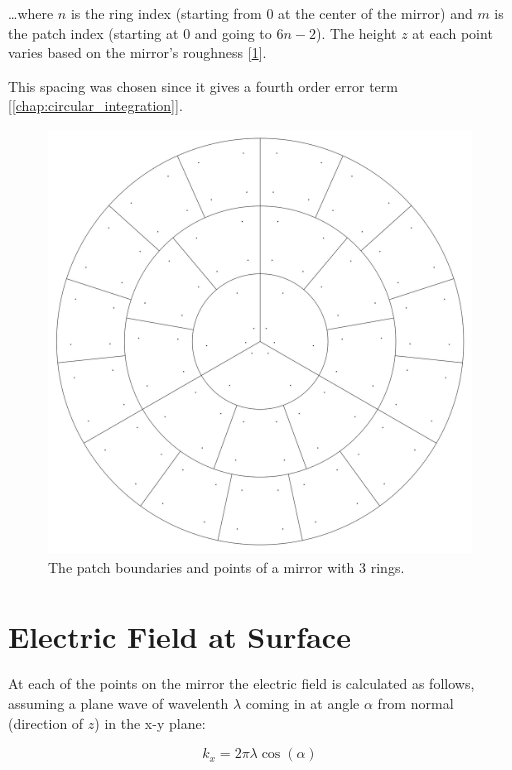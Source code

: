 \documentclass[etd,twoside,senior]{BYUPhys}
\begin{document}
\ldots where $n$ is the ring index (starting from 0 at the center of the mirror) and $m$ is the patch index (starting at 0 and going to $6n-2$). The height $z$ at each point varies based on the mirror's roughness [\ref{fig:patches_points}].

This spacing was chosen since it gives a fourth order error term [\ref{chap:circular_integration}].

\begin{figure}
  \centerline{\includegraphics[width=\textwidth]{circular-grid-with-points}}
  \caption[Mirror patch boundaries and point locations]{\label{fig:patches_points}
    The patch boundaries and points of a mirror with 3 rings.}
\end{figure}



\section{Electric Field at Surface}\label{chap:efield}

At each of the points on the mirror the electric field is calculated as follows, assuming a plane wave of wavelenth $\lambda$ coming in at angle $\alpha$ from normal (direction of $z$) in the x-y plane:

\begin{equation}
  k_{x}=2\pi\lambda\cos\left(\alpha\right)
\end{equation}
\end{document}
